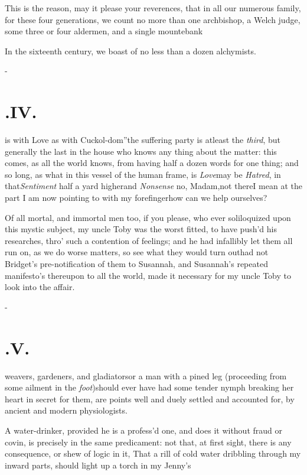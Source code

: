\documentclass{article}
\begin{document}
This is the reason, may it please your reverences, that in all
our numerous fa\-mily, for these four generations, we count no more
than one archbishop, a Welch judge, some three or four
aldermen, and a single mountebank\tsh

In the sixteenth century, we boast of no less than a dozen
alchymists.

\vfill{}\eject
\null\kern-\baselineskip
\section{.\enspace IV.}

 is with Love as with
Cuckol-\break dom”\tsh the suffering party is at\break least the
\textit{third}, but generally the last in the house who knows any
thing about the matter: this comes, as all the world knows, from
having half a dozen words for one thing; and so long, as what in
this vessel of the human frame, is \textit{Love}\tsk may be
\textit{Hatred}, in that\tsh \textit{Sentiment}\break
half a yard higher\tsh and \textit{Nonsense}\tsh\break
\tsh\!\tsk no, Madam,\tsk not there\tsk I\break
mean at the part I am now
pointing to with my forefinger\tsh how can we help\break
ourselves?

Of all mortal, and immortal men too, if you please, who ever soliloquized upon this
mystic subject, my uncle Toby was the worst fitted, to have push’d his researches,
thro’ such a contention of feelings; and he had infallibly let them all run on, as
we do worse matters, so see what they would turn out\tsh had not Bridget’s
pre-notification of them to\break
Susannah, and Susannah’s repeated manifesto’s thereupon
to all the world, made it necessary for my uncle Toby to look into the affair.

\vfill{}\eject
\null\kern-\baselineskip
\section{.\enspace V.}

 weavers, gardeners, and
gla\-diators\tsk or a man with a pined leg (proceeding from some
ailment in\break
the \textit{foot})\tsk should ever have had some tender
nymph breaking her heart in secret for them, are points well and
duely settled and accounted for, by ancient and modern
physiologists.

A water-drinker, provided he is a profess’d one, and does
it without fraud or covin, is precisely in the same predicament:
not that, at first sight, there is any consequence, or shew of
logic in it,\break
\lqq That a rill of cold water dribbling\break
\lqq through my inward parts, should light\break
\lqq up a torch in my Jenny’s\tsk{}
\end{document}

